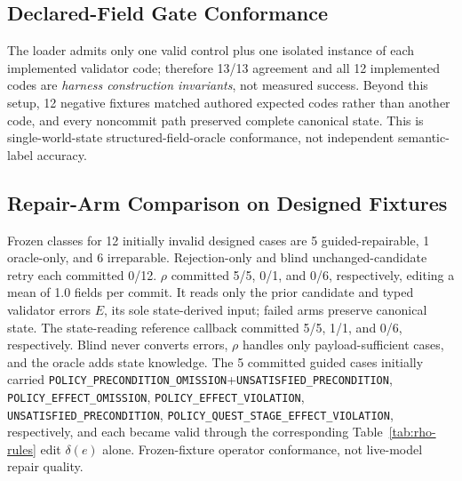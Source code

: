 \subsection{Declared-Field Gate Conformance}
The loader admits only one valid control plus one isolated instance of each implemented validator code; therefore 13/13 agreement and all 12 implemented codes are \emph{harness construction invariants}, not measured success. Beyond this setup, 12 negative fixtures matched authored expected codes rather than another code, and every noncommit path preserved complete canonical state. This is single-world-state structured-field-oracle conformance, not independent semantic-label accuracy.

\subsection{Repair-Arm Comparison on Designed Fixtures}
Frozen classes for 12 initially invalid designed cases are 5 guided-repairable, 1 oracle-only, and 6 irreparable. Rejection-only and blind unchanged-candidate retry each committed 0/12. $\rho$ committed 5/5, 0/1, and 0/6, respectively, editing a mean of 1.0 fields per commit. It reads only the prior candidate and typed validator errors $E$, its sole state-derived input; failed arms preserve canonical state. The state-reading reference callback committed 5/5, 1/1, and 0/6, respectively. Blind never converts errors, $\rho$ handles only payload-sufficient cases, and the oracle adds state knowledge. The 5 committed guided cases initially carried \texttt{POLICY\_\allowbreak{}PRECONDITION\_\allowbreak{}OMISSION}+\texttt{UNSATISFIED\_\allowbreak{}PRECONDITION}, \texttt{POLICY\_\allowbreak{}EFFECT\_\allowbreak{}OMISSION}, \texttt{POLICY\_\allowbreak{}EFFECT\_\allowbreak{}VIOLATION}, \texttt{UNSATISFIED\_\allowbreak{}PRECONDITION}, \texttt{POLICY\_\allowbreak{}QUEST\_\allowbreak{}STAGE\_\allowbreak{}EFFECT\_\allowbreak{}VIOLATION}, respectively, and each became valid through the corresponding Table~\ref{tab:rho-rules} edit $\delta(e)$ alone. Frozen-fixture operator conformance, not live-model repair quality.


